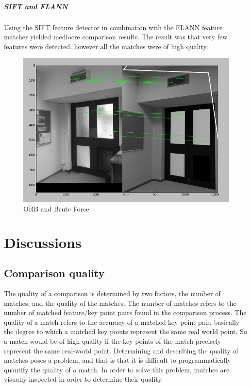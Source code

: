 \documentclass[11pt,a4paper]{report}
\begin{document}
				\paragraph{SIFT and FLANN}
					Using the SIFT feature detector in combination with the FLANN feature matcher yielded mediocre comparison results. The result was that very few features were detected, however all the matches were of high quality.
					\begin{figure}[H]
						\centering
						\includegraphics[width=1\textwidth]{sift_and_flann_results}
						\caption{ORB and Brute Force}
						\label{fig:sift_and_flann_results}
					\end{figure}

\chapter{Discussions}
	\section{Comparison quality}
	\label{comparison_quality}
		The quality of a comparison is determined by two factors, the number of matches, and the quality of the matches. The number of matches refers to the number of matched feature/key point pairs found in the comparison process. The quality of a match refers to the accuracy of a matched key point pair, basically the degree to which a matched key points represent the same real world point. So a match would be of high quality if the key points of the match precisely represent the same real-world point.
		Determining and describing the quality of matches poses a problem, and that is that it is difficult to programmatically quantify the quality of a match. In order to solve this problem, matches are visually inspected in order to determine their quality.
\end{document}
